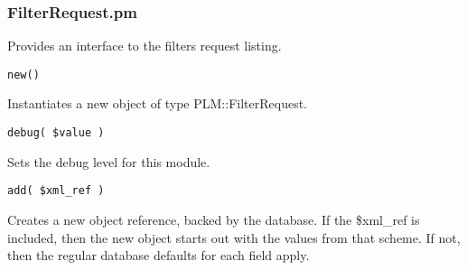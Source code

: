 \subsubsection{FilterRequest.pm}
Provides an interface to the filters request listing.

\begin{verbatim}
new()
\end{verbatim}
Instantiates a new object of type PLM::FilterRequest.

\begin{verbatim}
debug( $value )
\end{verbatim}
Sets the debug level for this module.

\begin{verbatim}
add( $xml_ref )
\end{verbatim}
Creates a new object reference, backed by the database.  If the \$xml\_ref is
included, then the new object starts out with the values from that scheme.  If
not, then the regular database defaults for each field apply.
